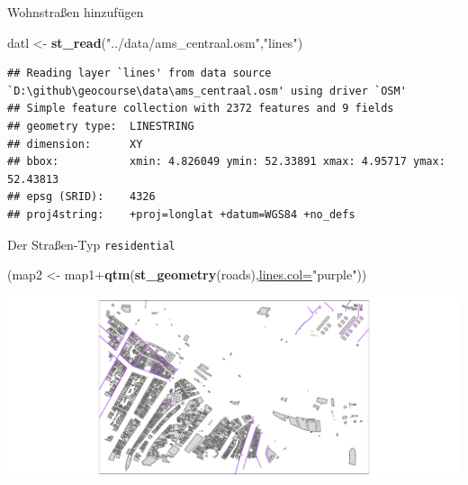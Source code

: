 \documentclass[ignorenonframetext,]{beamer}
\newenvironment{Shaded}{\begin{snugshade}}{\end{snugshade}}
\newcommand{\DataTypeTok}[1]{\textcolor[rgb]{0.74,0.68,0.62}{\underline{#1}}}
\newcommand{\KeywordTok}[1]{\textcolor[rgb]{0.26,0.66,0.93}{\textbf{#1}}}
\newcommand{\NormalTok}[1]{\textcolor[rgb]{0.74,0.68,0.62}{#1}}
\newcommand{\OperatorTok}[1]{\textcolor[rgb]{0.74,0.68,0.62}{#1}}
\newcommand{\StringTok}[1]{\textcolor[rgb]{0.02,0.61,0.04}{#1}}
\begin{document}
\begin{frame}[fragile]{Wohnstraßen hinzufügen}
\protect\hypertarget{wohnstraen-hinzufugen}{}

\begin{Shaded}
\begin{Highlighting}[]
\NormalTok{datl <-}\StringTok{ }\KeywordTok{st_read}\NormalTok{(}\StringTok{"../data/ams_centraal.osm"}\NormalTok{,}\StringTok{"lines"}\NormalTok{)}
\end{Highlighting}
\end{Shaded}

\begin{verbatim}
## Reading layer `lines' from data source `D:\github\geocourse\data\ams_centraal.osm' using driver `OSM'
## Simple feature collection with 2372 features and 9 fields
## geometry type:  LINESTRING
## dimension:      XY
## bbox:           xmin: 4.826049 ymin: 52.33891 xmax: 4.95717 ymax: 52.43813
## epsg (SRID):    4326
## proj4string:    +proj=longlat +datum=WGS84 +no_defs
\end{verbatim}

\begin{Shaded}
\end{Shaded}

\end{frame}

\begin{frame}[fragile]{Der Straßen-Typ \texttt{residential}}
\protect\hypertarget{der-straen-typ-residential}{}

\begin{Shaded}
\begin{Highlighting}[]
\NormalTok{(map2 <-}\StringTok{ }\NormalTok{map1}\OperatorTok{+}\KeywordTok{qtm}\NormalTok{(}\KeywordTok{st_geometry}\NormalTok{(roads),}\DataTypeTok{lines.col=}\StringTok{"purple"}\NormalTok{))}
\end{Highlighting}
\end{Shaded}

\includegraphics{B7_simplefeatures_files/figure-beamer/unnamed-chunk-35-1.pdf}

\end{frame}
\end{document}
